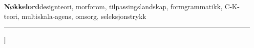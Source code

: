 {\begin{@twocolumnfalse}
\begin{minipage}{0.96\textwidth}
{\vspace{4pt}
\noindent\textbf{Nøkkelord}\quad designteori, morforom, tilpassingslandskap, formgrammatikk, C-K-teori, multiskala-agens, omsorg, seleksjonstrykk
}

\vspace{4pt}
\noindent\rule{\textwidth}{0.4pt}
\end{minipage}
\par

\vspace{8pt}

\end{@twocolumnfalse}
}]










\clearpage
\begingroup
\footnotesize
\printbibliography[title={Referansar}]
\endgroup


